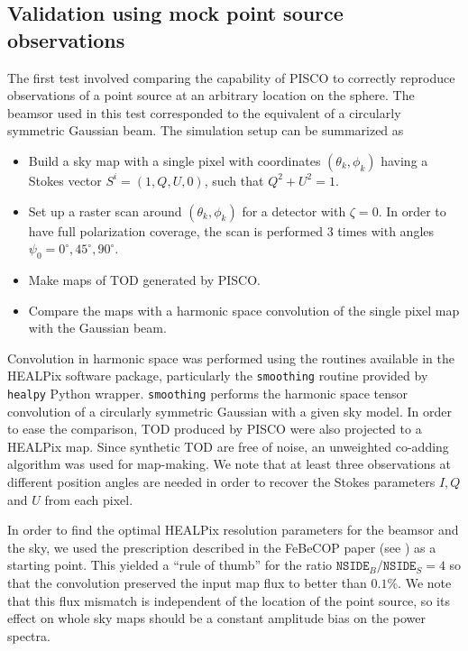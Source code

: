 \documentclass[a4paper,fleqn]{cas-dc}\sloppy
\begin{document}
	\subsection{Validation using mock point source observations}
	
	The first test involved comparing the capability of PISCO to correctly reproduce observations of a point source at an arbitrary location on the sphere. The beamsor used in this test corresponded to the equivalent of a circularly symmetric Gaussian beam. The simulation setup can be summarized as
	
	\begin{itemize}
		\item Build a sky map with a single pixel with coordinates $(\theta_k,\phi_k)$ having a Stokes vector $S^{i} = (1,Q,U,0)$, such that $Q^2 + U^2 = 1$.
		\item Set up a raster scan around $(\theta_k,\phi_k)$ for a detector with $\zeta=0$. In order to have full polarization coverage, the scan is performed 3 times with angles $\psi_0 = 0^{\circ},45^{\circ},90^{\circ}$.
		\item Make maps of TOD generated by PISCO.
		\item Compare the maps with a harmonic space convolution of the single pixel map with the Gaussian beam.
	\end{itemize}
	
	\noindent
	Convolution in harmonic space was performed using the routines available in the HEALPix software package\cite{2005ApJ...622..759G}, particularly the \texttt{smoothing} routine provided by \texttt{healpy} Python wrapper. \texttt{smoothing} performs the harmonic space tensor convolution of a circularly symmetric Gaussian with a given sky model. In order to ease the comparison, TOD produced by PISCO were also projected to a HEALPix map. Since synthetic TOD are free of noise, an unweighted co-adding algorithm was used for map-making. We note that at least three observations at different position angles are needed in order to recover the Stokes parameters $I,Q$ and $U$ from each pixel.
	
	In order to find the optimal HEALPix resolution parameters for the beamsor and the sky, we used the prescription described in the FeBeCOP paper (see \cite{2011ApJS..193....5M}) as a starting point. This yielded a ``rule of thumb'' for the ratio $\mathrm{\texttt{NSIDE}}_{B} / \mathrm{\texttt{NSIDE}}_{S} = 4$ so that the convolution preserved the input map flux to better than $0.1\%$. We note that this flux mismatch is independent of the location of the point source, so its effect on whole sky maps should be a constant amplitude bias on the power spectra.
	
\end{document}
